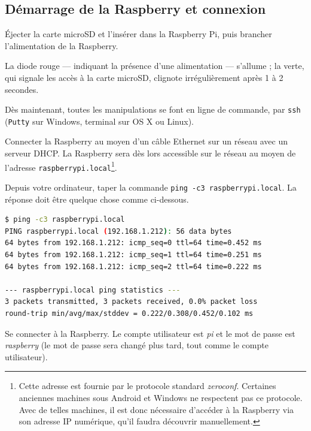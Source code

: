 \documentclass[11pt]{article}
\begin{document}
\subsection{Démarrage de la Raspberry et connexion}

Éjecter la carte microSD et l'insérer dans la Raspberry Pi, puis brancher l'alimentation de la Raspberry.

\begin{verification}
La diode rouge — indiquant la présence d'une alimentation — s'allume ; la verte, qui signale les accès à la carte microSD, clignote irrégulièrement après 1 à 2 secondes.
\end{verification}


Dès maintenant, toutes les manipulations se font en ligne de commande, par \lstinline{ssh} (\lstinline{Putty} sur Windows, terminal sur OS X ou Linux).

Connecter la Raspberry au moyen d'un câble Ethernet sur un réseau avec un serveur DHCP. La Raspberry sera dès lors accessible sur le réseau au moyen de l'adresse \lstinline{raspberrypi.local}\footnote{Cette adresse est fournie par le protocole standard \emph{zeroconf}. Certaines anciennes machines sous Android et Windows ne respectent pas ce protocole. Avec de telles machines, il est donc nécessaire d'accéder à la Raspberry via son adresse IP numérique, qu'il faudra découvrir manuellement.}.

\begin{verification}
Depuis votre ordinateur, taper la commande \lstinline{ping -c3 raspberrypi.local}. La réponse doit être quelque chose comme ci-dessous.

\begin{lstlisting}[language=bash]
$ ping -c3 raspberrypi.local
PING raspberrypi.local (192.168.1.212): 56 data bytes
64 bytes from 192.168.1.212: icmp_seq=0 ttl=64 time=0.452 ms
64 bytes from 192.168.1.212: icmp_seq=1 ttl=64 time=0.251 ms
64 bytes from 192.168.1.212: icmp_seq=2 ttl=64 time=0.222 ms

--- raspberrypi.local ping statistics ---
3 packets transmitted, 3 packets received, 0.0% packet loss
round-trip min/avg/max/stddev = 0.222/0.308/0.452/0.102 ms
\end{lstlisting}
\end{verification}

Se connecter à la Raspberry. Le compte utilisateur est \emph{pi} et le mot de passe est \emph{raspberry} (le mot de passe sera changé plus tard, tout comme le compte utilisateur).
\end{document}
